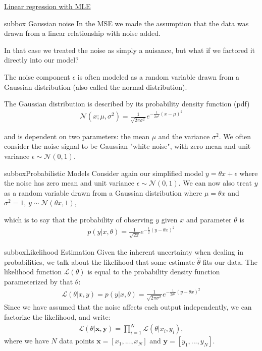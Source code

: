 \begin{textbox}{\href{https://compneuro.neuromatch.io/tutorials/W1D2_ModelFitting/student/W1D2_Tutorial2.html}{Linear regression with MLE }  }
\begin{subbox}{subbox}{ Gaussian noise}
\scriptsize
In the MSE we made the assumption that the data was drawn from a linear relationship with noise added.

In that case we treated the noise as simply a nuisance, but what if we factored it directly into our model?

The noise component $\epsilon$ is often modeled as a random variable drawn from a Gaussian distribution (also called the normal distribution).

The Gaussian distribution is described by its probability density function (pdf)
\begin{align}
\mathcal{N}(x; \mu, \sigma^2) = \frac{1}{\sqrt{2\pi\sigma^2}}e^{-\frac{1}{2\sigma^2}(x-\mu)^2}
\end{align}

and is dependent on two parameters: the mean $\mu$ and the variance $\sigma^2$. We often consider the noise signal to be Gaussian "white noise", with zero mean and unit variance
$\epsilon \sim \mathcal{N}(0, 1).
$

\end{subbox}
\begin{subbox}{subbox}{Probabilistic Models}
\scriptsize
Consider again our simplified model $y = \theta x + \epsilon$ where the noise has zero mean and unit variance $\epsilon \sim \mathcal{N}(0, 1)$. We can now also treat $y$ as a random variable drawn from a Gaussian distribution where $\mu = \theta x$ and $\sigma^2 = 1$, 
$y \sim \mathcal{N}(\theta x, 1),
$

which is to say that the probability of observing $y$ given $x$ and parameter $\theta$ is
\begin{align}
p(y|x,\theta) = \frac{1}{\sqrt{2\pi}}e^{-\frac{1}{2}(y-\theta x)^2}
\end{align}

\end{subbox}

\begin{subbox}{subbox}{Likelihood Estimation}
\scriptsize
 Given the inherent uncertainty when dealing in probabilities, we talk about the likelihood that some estimate $\hat{\theta}$ fits our data. The likelihood function $\mathcal{L}(\theta)$ is equal to the probability density function parameterized by that $\theta$:
\begin{align}
\mathcal{L}(\theta|x,y) = p(y|x,\theta) = \frac{1}{\sqrt{2\pi\sigma^2}}e^{-\frac{1}{2\sigma^2}(y-\theta x)^2}
\end{align}
Since we have assumed that the noise affects each output independently, we can factorize the likelihood, and write:
\begin{align}
\mathcal{L}(\theta|\mathbf{x}, \mathbf{y}) = \prod_{i=1}^N \mathcal{L}(\theta|x_i,y_i),
\end{align}
where we have $N$ data points $\mathbf{x} = [x_1,...,x_N]$ and $\mathbf{y} = [y_1,...,y_N]$.
\end{subbox}
\end{textbox}
